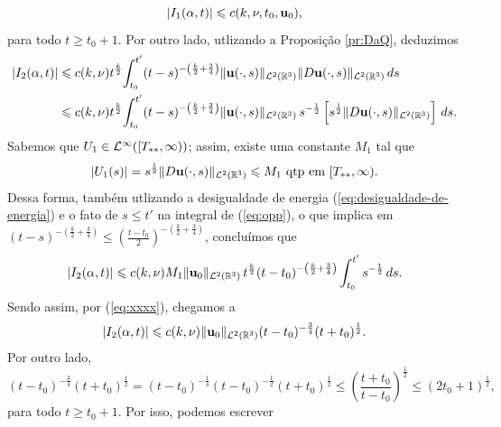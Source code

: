\begin{prf}
    \begin{equation} \label{eq:W1}
        |I_1(\alpha,t)| \leqslant c(k,\nu,t_0,\mathbf{u}_0),
    \end{equation}
    para todo $t \geqslant t_0 + 1$. Por outro lado, utlizando a Proposição \ref{pr:DaQ}, deduzimos
    \begin{equation} \label{eq:opp}
        \begin{aligned}
            |I_2(\alpha,t)| &\leqslant c(k,\nu) t^{\frac{k}{2}} \! \int_{t_0}^{t'} (t-s)^{-\left( \frac{k}{2} + \frac{3}{4} \right)} \Vert \mathbf{u}(\cdot,s) \Vert_{\mathcal{L}^2(\mathbb{R}^3)} \Vert D\mathbf{u}(\cdot,s) \Vert_{\mathcal{L}^2(\mathbb{R}^3)} \,ds\\
            &\leqslant c(k,\nu)t^{\frac{k}{2}} \!\int_{t_0}^{t'} (t-s)^{-\left( \frac{k}{2} + \frac{3}{4} \right)} \Vert \mathbf{u}(\cdot,s) \Vert_{\mathcal{L}^2(\mathbb{R}^3)} \, s^{-\frac{1}{2}} \left[ s^{\frac{1}{2}} \Vert D\mathbf{u}(\cdot,s) \Vert_{\mathcal{L}^2(\mathbb{R}^3)} \right] \,ds.
        \end{aligned}
    \end{equation}
    Sabemos que $U_1 \in \mathcal{L}^\infty([T_{**},\infty))$; assim, existe uma constante $M_1$ tal que
    \begin{equation} \label{eq:C1}
        |U_1(s)| = s^{\frac{1}{2}} \Vert D\mathbf{u}(\cdot,s) \Vert_{\mathcal{L}^2(\mathbb{R}^3)} \leqslant M_1 \text{ qtp em } [T_{**},\infty).
    \end{equation}
    Dessa forma, também utlizando a desigualdade de energia (\ref{eq:desigualdade-de-energia}) e o fato de $s \leqslant t'$ na integral de (\ref{eq:opp}), o que implica em $(t-s)^{-\left( \frac{k}{2} + \frac{3}{4} \right)} \leqslant \left( \frac{t - t_0}{2} \right)^{-\left( \frac{k}{2} + \frac{3}{4} \right)}$, concluímos que
    \[
        |I_2(\alpha,t)|\leqslant c(k,\nu) M_1 \Vert \mathbf{u}_0 \Vert_{\mathcal{L}^2(\mathbb{R}^3)}\, t^{\frac{k}{2}} (t-t_0)^{-\left(\frac{k}{2} + \frac{3}{4} \right)} \int_{t_0}^{t'} s^{-\frac{1}{2}} \,ds.
    \]
    Sendo assim, por (\ref{eq:xxxx}), chegamos a
    \begin{equation} \label{eq:B3}
        |I_2(\alpha,t)|\leqslant c(k,\nu) \Vert \mathbf{u}_0 \Vert_{\mathcal{L}^2(\mathbb{R}^3)} (t-t_0)^{-\frac{3}{4}} (t + t_0)^{\frac{1}{2}}.
    \end{equation}
    Por outro lado,
    \[
        (t - t_0)^{-\frac{3}{4}} (t + t_0)^{\frac{1}{2}} = (t - t_0)^{-\frac{1}{4}} (t - t_0)^{-\frac{1}{2}} (t + t_0)^{\frac{1}{2}} \leqslant \left( \frac{t + t_0}{t- t_0} \right)^{\frac{1}{2}} \leqslant (2t_0 + 1)^{\frac{1}{2}},
    \]
    para todo $t \geqslant t_0 + 1$.
    Por isso, podemos escrever
    \begin{equation} \label{eq:W2}

\end{equation}
\end{prf}
